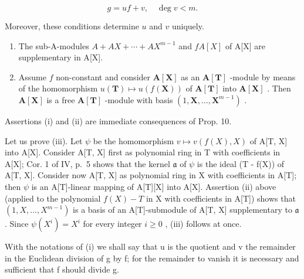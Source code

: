 \[
g = u f + v, \quad \deg v <   m.
\]

Moreover, these conditions determine \(u\) and \(v\) uniquely.

\begin{enumerate}
\def\labelenumi{(\roman{enumi})}
\setcounter{enumi}{1}
\item
  The sub-A-modules \(A + AX + \cdots + AX^{m-1}\) and \(fA[X]\) of A{[}X{]} are supplementary in A{[}X{]}.
\item
  Assume \(f\) non-constant and consider \(\mathbf{A}[\mathbf{X}]\) as an \(\mathbf{A}[\mathbf{T}]\) -module by means of the homomorphism \(u(\mathbf{T}) \mapsto u(f(\mathbf{X}))\) of \(\mathbf{A}[\mathbf{T}]\) into \(\mathbf{A}[\mathbf{X}]\) . Then \(\mathbf{A}[\mathbf{X}]\) is a free \(\mathbf{A}[\mathbf{T}]\) -module with basis \((1, \mathbf{X}, \ldots, \mathbf{X}^{m-1})\) .
\end{enumerate}

Assertions (i) and (ii) are immediate consequences of Prop. 10.

Let us prove (iii). Let \(\psi\) be the homomorphism \(v \mapsto v(f(X), X)\) of A{[}T, X{]} into A{[}X{]}. Consider A{[}T, X{]} first as polynomial ring in T with coefficients in A{[}X{]}; Cor. 1 of IV, p.~5 shows that the kernel \(\mathfrak{a}\) of \(\psi\) is the ideal (T - f(X)) of A{[}T, X{]}. Consider now A{[}T, X{]} as polynomial ring in X with coefficients in A{[}T{]}; then \(\psi\) is an A{[}T{]}-linear mapping of A{[}T{]}{[}X{]} into A{[}X{]}. Assertion (ii) above (applied to the polynomial \(f(X) - T\) in X with coefficients in A{[}T{]}) shows that \((1, X, ..., X^{m-1})\) is a basis of an A{[}T{]}-submodule of A{[}T, X{]} supplementary to \(\mathfrak{a}\) . Since \(\psi(X^i) = X^i\) for every integer \(i \geqslant 0\) , (iii) follows at once.

With the notations of (i) we shall say that u is the quotient and v the remainder in the Euclidean division of g by f; for the remainder to vanish it is necessary and sufficient that f should divide g.

